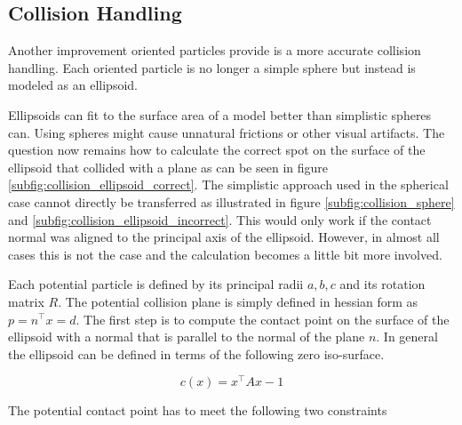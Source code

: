 \subsection{Collision Handling}
\label{subsec:collision_handling}

Another improvement oriented particles provide is a more accurate collision handling. Each oriented particle is no longer a simple sphere but instead is modeled as an ellipsoid.

\begin{figure}[htb]
	\centering
	\label{fig:collision_handling}
\end{figure}

Ellipsoids can fit to the surface area of a model better than simplistic spheres can. Using spheres might cause unnatural frictions or other visual artifacts. The question now remains how to calculate the correct spot on the surface of the ellipsoid that collided with a plane as can be seen in figure \ref{subfig:collision_ellipsoid_correct}. The simplistic approach used in the spherical case cannot directly be transferred as illustrated in figure \ref{subfig:collision_sphere} and \ref{subfig:collision_ellipsoid_incorrect}. This would only work if the contact normal was aligned to the principal axis of the ellipsoid. However, in almost all cases this is not the case and the calculation becomes a little bit more involved.

Each potential particle is defined by its principal radii $a,b,c$ and its rotation matrix $R$. The potential collision plane is simply defined in hessian form as $p = n^\top x=d$. The first step is to compute the contact point on the surface of the ellipsoid with a normal that is parallel to the normal of the plane $n$. In general the ellipsoid can be defined in terms of the following zero iso-surface.

\begin{equation}
c(x) = x^\top A x - 1
\end{equation}

The potential contact point has to meet the following two constraints

